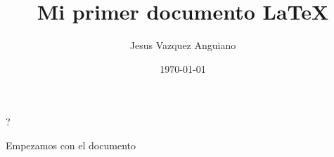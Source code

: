\documentclass[12pt,a4paper,titlepage]{report}
\title{Mi primer documento \LaTeX{}}
\author{Jesus Vazquez Anguiano}
\date{\today}
\begin{document}
?%


\maketitle

Empezamos con el documento
\end{document}
